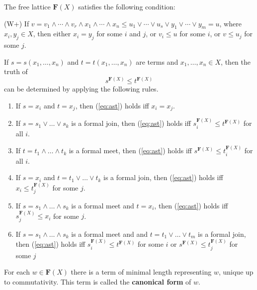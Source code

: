 \begin{theorem}  \label{thm:whitman2}
  The free lattice $\mathbf{F}(X)$ satisfies the following condition:
  
  (W+)  If $v = v_1 \wedge \cdots \wedge v_r \wedge x_1 \wedge \cdots
  \wedge x_n \leqslant u_1 \vee \cdots \vee u_s \vee
  y_1 \vee \cdots \vee y_m = u$, where $x_i, y_j\in X$, then either 
  $x_i = y_j$ for some $i$ and $j$, or $v_i \leqslant u$ for some $i$, or
  $v \leqslant u_j$ for some $j$. 
  \end{theorem}
  
\begin{theorem}
  \label{thm:wordprob}
If $s = s(x_1, \dots, x_n)$ and $t = t(x_1, \dots, x_n)$ are terms and $x_1, \dots, x_n \in X$, then the truth of 
\begin{equation}
  \label{eq:ast}
s^{\mathbf{F}(X)} \leqslant t^{\mathbf{F}(X)}
\end{equation}
can be determined by applying the following rules.
\begin{enumerate}
\item If $s=x_i$ and $t=x_j$, then (\ref{eq:ast}) holds iff $x_i = x_j$.
\item If $s = s_1 \vee \dots \vee s_k$ is a formal join, then (\ref{eq:ast}) holds iff $s_i^{\mathbf{F}(X)} \leqslant t^{\mathbf{F}(X)}$ for all $i$.
\item If $t = t_1 \wedge \dots \wedge t_k$ is a formal meet, then (\ref{eq:ast}) holds iff 
$s^{\mathbf{F}(X)} \leqslant t_i^{\mathbf{F}(X)}$ for all $i$.
\item If $s = x_i$ and $t = t_1 \vee \dots \vee t_k$ is a formal join, 
   then (\ref{eq:ast}) holds iff $x_i \leqslant t_j^{\mathbf{F}(X)}$ for some $j$.
\item If $s = s_1 \wedge \dots \wedge s_k$ is a formal meet and $t = x_i$, then (\ref{eq:ast}) holds iff $s_j^{\mathbf{F}(X)} \leqslant x_i$ for some $j$.
\item If $s = s_1 \wedge \dots \wedge s_k$ is a formal meet and 
and $t = t_1 \vee \dots \vee t_m$ is a formal join, then (\ref{eq:ast}) holds iff 
$s_i^{\mathbf{F}(X)} \leqslant t^{\mathbf{F}(X)}$ for some $i$
or $s^{\mathbf{F}(X)} \leqslant t_j^{\mathbf{F}(X)}$ for some $j$
\end{enumerate}
\end{theorem}

\begin{theorem} For each $w \in \mathbf F (X)$ 
  there is a term of minimal length representing $w$, unique up to commutativity. 
  This term is called the \textbf{canonical form} of $w$.
\end{theorem}


